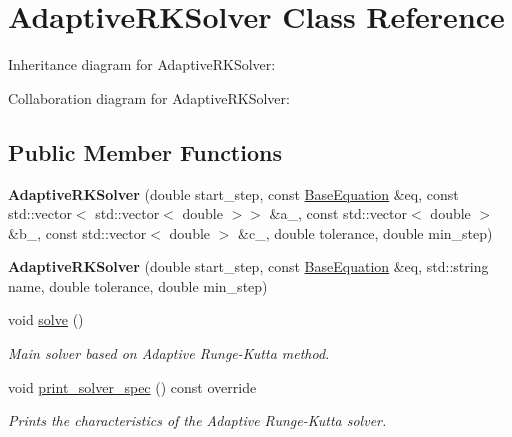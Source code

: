 \hypertarget{classAdaptiveRKSolver}{}\section{Adaptive\+R\+K\+Solver Class Reference}
\label{classAdaptiveRKSolver}


Inheritance diagram for Adaptive\+R\+K\+Solver\+:


Collaboration diagram for Adaptive\+R\+K\+Solver\+:
\subsection*{Public Member Functions}
\begin{DoxyCompactItemize}
\item 
\mbox{\label{classAdaptiveRKSolver_af3fd0e899dbda2be0ff705f8d8ea7a08}} 
{\bfseries Adaptive\+R\+K\+Solver} (double start\+\_\+step, const \hyperlink{classBaseEquation}{Base\+Equation} \&eq, const std\+::vector$<$ std\+::vector$<$ double $>$$>$ \&a\+\_\+, const std\+::vector$<$ double $>$ \&b\+\_\+, const std\+::vector$<$ double $>$ \&c\+\_\+, double tolerance, double min\+\_\+step)
\item 
\mbox{\label{classAdaptiveRKSolver_a6d3aa9cd741ce79167448dfb405f9ff2}} 
{\bfseries Adaptive\+R\+K\+Solver} (double start\+\_\+step, const \hyperlink{classBaseEquation}{Base\+Equation} \&eq, std\+::string name, double tolerance, double min\+\_\+step)
\item 
\mbox{\label{classAdaptiveRKSolver_ad4178bf295f9101b27ca96a92deb8c3e}} 
void \hyperlink{classAdaptiveRKSolver_ad4178bf295f9101b27ca96a92deb8c3e}{solve} ()
\begin{DoxyCompactList}\small\item\em Main solver based on Adaptive Runge-\/\+Kutta method. \end{DoxyCompactList}\item 
\mbox{\label{classAdaptiveRKSolver_aba981c5c2b0816506bc3a2e1c21d5bc9}} 
void \hyperlink{classAdaptiveRKSolver_aba981c5c2b0816506bc3a2e1c21d5bc9}{print\+\_\+solver\+\_\+spec} () const override
\begin{DoxyCompactList}\small\item\em Prints the characteristics of the Adaptive Runge-\/\+Kutta solver. \end{DoxyCompactList}\end{DoxyCompactItemize}
